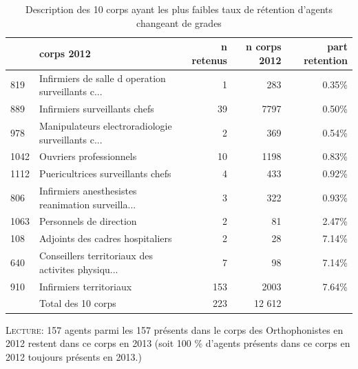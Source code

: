 \documentclass[11pt,a4paper]{article}
\begin{document}
\begin{table}[h!]
	\label{means}
	\centering
	\caption{Description des 10 corps ayant les plus faibles taux de rétention d'agents changeant de grades} 
	\begin{tabular}{llrrr}
	\toprule
	{} &                                     corps 2012 &  n retenus &  n corps 2012 &  part retention \\
	\midrule
	819  &  Infirmiers de salle d operation surveillants c... &                1 &                                          283 &                                              0.35\% \\
	889  &                      Infirmiers surveillants chefs &               39 &                                         7797 &                                              0.50\% \\
	978  &  Manipulateurs electroradiologie surveillants c... &                2 &                                          369 &                                              0.54\% \\
	1042 &                            Ouvriers professionnels &               10 &                                         1198 &                                              0.83\% \\
	1112 &                  Puericultrices surveillants chefs &                4 &                                          433 &                                              0.92\% \\
	806  &  Infirmiers anesthesistes reanimation surveilla... &                3 &                                          322 &                                              0.93\% \\
	1063 &                            Personnels de direction &                2 &                                           81 &                                              2.47\% \\
	108  &                   Adjoints des cadres hospitaliers &                2 &                                           28 &                                              7.14\% \\
	640  &  Conseillers territoriaux des activites physiqu... &                7 &                                           98 &                                              7.14\% \\
	910  &                            Infirmiers territoriaux &              153 &                                         2003 &                                              7.64\% \\
	    & Total des 10 corps & 223 & 12 612 \\
\end{tabular}
\begin{minipage}{15cm}
\footnotesize
\textsc{Lecture:} 157 agents parmi les 157 présents dans le corps des Orthophonistes en 2012 restent dans ce corps en 2013 (soit 100 \% d'agents présents dans ce corps en 2012 toujours présents en 2013.)
\end{minipage}
\end{table}
\end{document}
